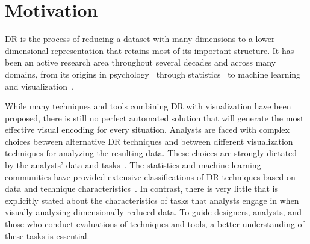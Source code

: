 
\section{Motivation}
\label{drvistasks:intro}


\ac{DR} is the process of reducing a dataset with many dimensions to a lower-dimensional representation that retains most of its important structure. 
It has been an active research area throughout several decades and across many domains, from its origins in psychology~\cite{Torgerson1952,Young1938} through statistics~\cite{Buja2002} to machine learning
~\cite{Jain2000,Tenenbaum2000,VanderMaaten2008} and visualization~\cite{Ingram2010,Ingram2009,Johansson2009,Yang2003}.

While many techniques and tools combining \ac{DR} with visualization have been proposed, there is still no perfect automated solution that will generate the most effective visual encoding for every situation. 
Analysts are faced with complex choices between alternative \ac{DR} techniques and between different visualization techniques for analyzing the resulting data.
These choices are strongly dictated by the analysts' data and tasks~\cite{Tatu2010a}. 
The statistics and machine learning communities have provided extensive classifications of \ac{DR} techniques based on data and technique characteristics~\cite{Cunningham2008,France2011,Guyon2003,Jain2000,VanderMaaten2009,Witten2011}.
In contrast, there is very little that is explicitly stated about the characteristics of tasks that analysts engage in when visually analyzing dimensionally reduced data. 
To guide designers, analysts, and those who conduct evaluations of techniques and tools, a better understanding of these tasks is essential.


